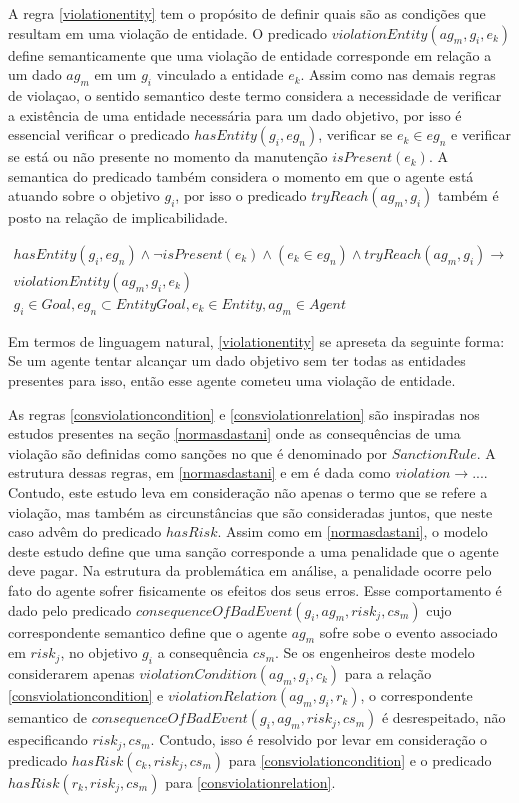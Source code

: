 A regra \ref{violationentity} tem o propósito de definir quais são as condições que resultam em uma violação de entidade. O predicado $violationEntity(ag_m,g_i,e_k)$ 
define semanticamente que uma violação de entidade corresponde em relação a um dado $ag_m$ em um $g_i$ vinculado a entidade $e_k$. Assim como nas demais
regras de violaçao, o sentido semantico deste termo considera a necessidade de verificar a existência de uma entidade necessária para um dado objetivo, 
por isso é essencial verificar o predicado $hasEntity(g_i,eg_n)$, verificar se $e_k \in eg_n$ e verificar se está ou não presente no momento da manutenção 
$isPresent(e_k)$. A semantica do predicado também considera o momento em que o agente está atuando sobre o objetivo $g_i$, por isso o predicado $tryReach(ag_m,g_i)$
também é posto na relação de implicabilidade.

\begin{eqnarray}\label{violationentity}\nonumber
	hasEntity(g_i,eg_n) \wedge \neg isPresent(e_k) 	\wedge (e_k \in eg_n) \wedge tryReach(ag_m,g_i) \to \nonumber \\ 
    violationEntity(ag_m,g_i,e_k)  \nonumber \\  
    g_i \in Goal, eg_n \subset EntityGoal, e_k \in Entity, ag_m \in Agent
\end{eqnarray}

Em termos de linguagem natural, \ref{violationentity} se apreseta da seguinte forma: Se um agente tentar alcançar um dado objetivo sem ter todas as entidades
presentes para isso, então esse agente cometeu uma violação de entidade.

As regras \ref{consviolationcondition} e \ref{consviolationrelation} são inspiradas nos estudos presentes na seção \ref{normasdastani} onde as consequências 
de uma violação são definidas como sanções no que é denominado por $Sanction Rule$. A estrutura dessas regras, em \ref{normasdastani} e em \cite{dastaniframework} 
é dada como $violation \to ... $. Contudo, este estudo leva em consideração não apenas o termo que se refere a violação, mas também as circunstâncias 
que são consideradas juntos, que neste caso advêm do predicado $hasRisk$. Assim como em \ref{normasdastani}, o modelo deste estudo define que uma sanção 
corresponde a uma penalidade que o agente deve pagar. Na estrutura da problemática em análise, a penalidade ocorre pelo fato do agente sofrer fisicamente 
os efeitos dos seus erros. Esse comportamento é dado pelo predicado $consequenceOfBadEvent(g_i,ag_m,risk_j,cs_m)$ cujo correspondente semantico define 
que o agente $ag_m$ sofre sobe o evento associado em $risk_j$, no objetivo $g_i$ a consequência $cs_m$. Se os engenheiros deste modelo considerarem 
apenas $violationCondition(ag_m,g_i,c_k)$ para a relação \ref{consviolationcondition} e $violationRelation(ag_m,g_i,r_k)$, o correspondente semantico de 
$consequenceOfBadEvent(g_i,ag_m,risk_j,cs_m)$ é desrespeitado, não especificando $risk_j,cs_m$. Contudo, isso é resolvido por levar em consideração 
o predicado $hasRisk(c_k,risk_j,cs_m)$ para \ref{consviolationcondition} e o predicado $hasRisk(r_k,risk_j,cs_m)$ para \ref{consviolationrelation}. 

